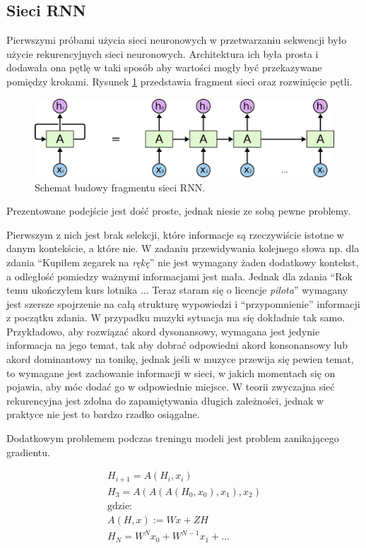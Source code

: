 \documentclass[data-science]{agh-wi} %
\begin{document}
\subsection{Sieci RNN}
Pierwszymi próbami użycia sieci neuronowych w przetwarzaniu sekwencji było użycie rekurencyjnych sieci neuronowych. Architektura ich była prosta i dodawała ona pętlę w taki sposób aby wartości mogły być przekazywane pomiędzy krokami. Rysunek \ref*{fig:rnn_scheme} przedstawia fragment sieci oraz rozwinięcie pętli.
\begin{figure}[ht!]
    \begin{center}
        \includegraphics[width=0.7\linewidth]{./img/rnn_scheme.png}
    \end{center}
    \caption{Schemat budowy fragmentu sieci RNN.}\label{fig:rnn_scheme}
\end{figure}

Prezentowane podejście jest dość proste, jednak niesie ze sobą pewne problemy.

Pierwszym z nich jest brak selekcji, które informacje są rzeczywiście istotne w danym kontekście, a które nie. W zadaniu przewidywania kolejnego słowa np. dla zdania ``Kupiłem zegarek na \textit{rękę}'' nie jest wymagany żaden dodatkowy kontekst, a odległość pomiedzy ważnymi informacjami jest mała. Jednak dla zdania ``Rok temu ukończyłem kurs lotnika ... Teraz staram się o licencje \textit{pilota}'' wymagany jest szersze spojrzenie na całą strukturę wypowiedzi i ``przypomnienie'' informacji z początku zdania. W przypadku muzyki sytuacja ma się dokładnie tak samo. Przykładowo, aby rozwiązać akord dysonansowy, wymagana jest jedynie informacja na jego temat, tak aby dobrać odpowiedni akord konsonansowy lub akord dominantowy na tonikę, jednak jeśli w muzyce przewija się pewien temat, to wymagane jest zachowanie informacji w sieci, w jakich momentach się on pojawia, aby móc dodać go w odpowiednie miejsce. W teorii zwyczajna sieć rekurencyjna jest zdolna do zapamiętywania długich zależności, jednak w praktyce nie jest to bardzo rzadko osiągalne.

Dodatkowym problemem podczas treningu modeli jest problem zanikającego gradientu.

\begin{equation}
    \begin{matrix}
        H_{i+1}=A(H_i, x_i)             \\
        H_3=A(A(A(H_0, x_0), x_1), x_2) \\
        \text{gdzie:}                   \\
        A(H, x) := Wx+ZH                \\
        H_N=W^Nx_0 + W^{N-1}x_1  + \dots
    \end{matrix}
\end{equation}
\end{document}

